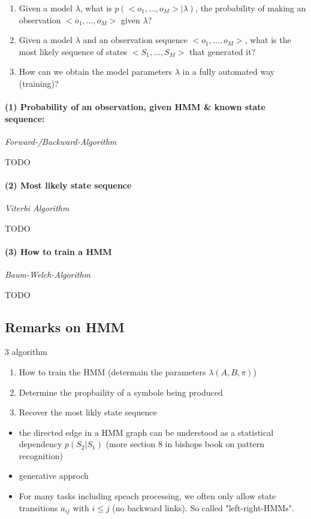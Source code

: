 \begin{enumerate}
	\item Given a model \(\lambda\), what is \(p(<o_1,\dots, o_M>|\lambda)\), the probability of making an observation \(<o_1,\dots, o_M>\) given \(\lambda\)?
	\item Given a model \(\lambda\) and an observation sequence \(<o_1,\dots, o_M>\), what is the most likely sequence of states \(<S_1,\dots, S_M>\) that generated it?
	\item How can we obtain the model parameters \(\lambda\) in a fully automated way (training)?
\end{enumerate}

\paragraph{(1) Probability of an observation, given HMM \& known state sequence:} \emph{Forward-/Backward-Algorithm}

TODO

\paragraph{(2) Most likely state sequence} \emph{Viterbi Algorithm}

TODO

\paragraph{(3) How to train a HMM} \emph{Baum-Welch-Algorithm}

TODO

\subsection*{Remarks on HMM}

3 algorithm
\begin{enumerate}
    \item  How to train the HMM (determain the parameters $\lambda (A, B, \pi)$)
    \item  Determine the propbaility of a symbole being produced
    \item  Recover the most likly state sequence
\end{enumerate}

\begin{itemize}
    \item the directed edge in a HMM graph can be understood as a statistical dependency $p(S_2|S_1)$ (more section 8 in bishops book on pattern recognition)
    \item generative approch
    \item For many tasks including speach processing, we often only allow state transitions $a_{ij}$ with $i \le j$ (no backward links). So called "left-right-HMMs".
\end{itemize}
